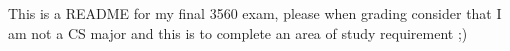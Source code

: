 This is a R\+E\+A\+D\+ME for my final 3560 exam, please when grading consider that I am not a CS major and this is to complete an area of study requirement ;) 